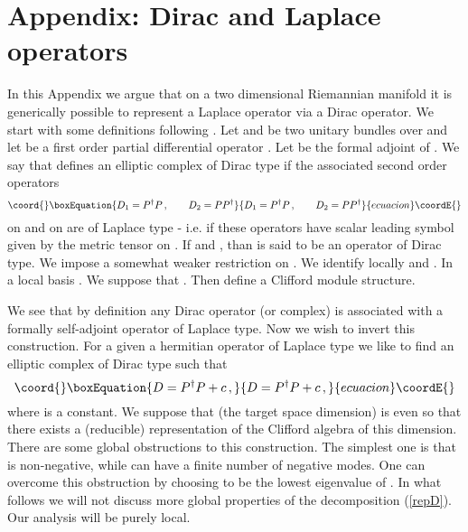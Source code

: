 \documentclass[a4paper,12pt,twoside]{article}
\begin{document}
\section*{Appendix: Dirac and Laplace operators}
In this Appendix we argue that on a two dimensional
Riemannian
manifold \coordHE{} it is generically possible to represent a
Laplace operator via a Dirac operator. We start with
some definitions
following \cite{Dowker:2000sy}. Let \coordHE{} and \coordHE{} be
two unitary bundles over \coordHE{} and let \coordHE{} be a first
order partial differential operator 
\coordHE{}.
Let \coordHE{} be the formal adjoint of \coordHE{}.
We say that \coordHE{} defines an elliptic complex of Dirac type if
the associated second order operators 
\begin{equation}\coord{}\boxEquation{
D_1=P^\dag P \,,\qquad D_2=PP^\dag \label{defDD}
}{
D_1=P^\dag P \,,\qquad D_2=PP^\dag }{ecuacion}\coordE{}\end{equation}
on \coordHE{} and on \coordHE{}
are of Laplace type - i.e. if these operators have scalar
leading symbol given by the metric tensor on \coordHE{}. If 
\coordHE{} and \coordHE{}, than \coordHE{} is said to be
an operator of Dirac type. We impose a somewhat weaker restriction
on \coordHE{}. We identify locally \coordHE{} and \coordHE{}.
In a local basis \coordHE{}. We suppose
that \coordHE{}. Then \myHighlight{$\gamma$}\coordHE{} define
a Clifford module structure. 

We see that by definition any Dirac operator (or complex)
is associated with a formally self-adjoint operator of
Laplace type. Now we wish to invert this construction.
For a given a hermitian operator \coordHE{} of Laplace type we like to find
an elliptic complex of Dirac type such that
\begin{equation}\coord{}\boxEquation{
D=P^\dag P +c\,,\label{repD}
}{
D=P^\dag P +c\,,}{ecuacion}\coordE{}\end{equation}
where \coordHE{} is a constant. We suppose that \coordHE{}
(the target space dimension) is even so that there exists
a (reducible) representation of the Clifford algebra of
this dimension. There are some global obstructions
to this construction. The simplest one is that \coordHE{}
is non-negative, while \coordHE{} can have a finite number of
negative modes. One can overcome this obstruction by
choosing \coordHE{} to be the lowest eigenvalue of \coordHE{}.
In what follows we will not discuss more global properties of
the decomposition (\ref{repD}). Our analysis will be purely
local.
\end{document}

